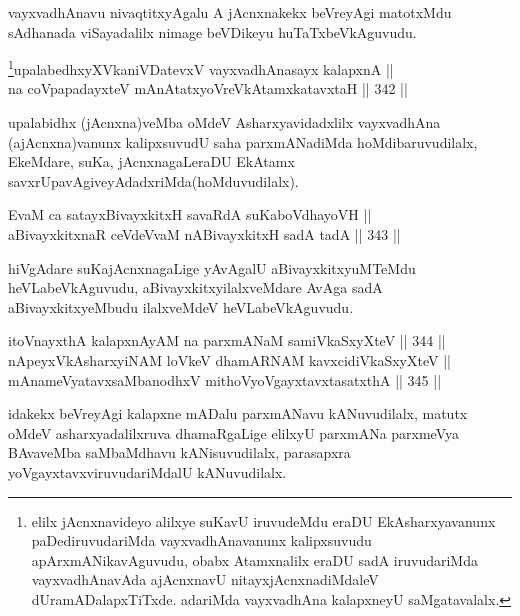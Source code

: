 \begin{artha}
vayxvadhAnavu nivaqtitxyAgalu A jAcnxnakekx beVreyAgi matotxMdu
sAdhanada viSayadalilx nimage beVDikeyu huTaTxbeVkAguvudu.
\end{artha}

\begin{shl}
\footnote{elilx jAcnxnavideyo alilxye suKavU iruvudeMdu eraDU EkAsharxyavanunx paDediruvudariMda vayxvadhAnavanunx kalipxsuvudu apArxmANikavAguvudu, obabx Atamxnalilx eraDU sadA iruvudariMda vayxvadhAnavAda ajAcnxnavU nitayxjAcnxnadiMdaleV dUramADalapxTiTxde. adariMda vayxvadhAna kalapxneyU saMgatavalalx.}upalabedhxyXVkaniVDatevxV vayxvadhAnasayx kalapxnA || \\
na coVpapadayxteV mAnAtatxyoVreVkAtamxkatavxtaH \hfill || 342 ||  
\end{shl}

\begin{artha}
upalabidhx (jAcnxna)veMba oMdeV Asharxyavidadxlilx
vayxvadhAna (ajAcnxna)\break vanunx kalipxsuvudU saha parxmANadiMda hoMdibaruvudilalx, EkeMdare, suKa, jAcnxnagaLeraDU EkAtamx
savxrUpavAgiveyAdadxriMda\break (hoMduvudilalx).
\end{artha}


\begin{shl}
EvaM ca satayxBivayxkitxH savaRdA suKaboVdhayoVH || \\
aBivayxkitxnaR ceVdeVvaM nABivayxkitxH sadA tadA \hfill || 343 ||  
\end{shl}

\begin{artha}
hiVgAdare suKajAcnxnagaLige yAvAgalU aBivayxkitxyuMTeMdu
heVLabeVkAguvudu, aBivayxkitxyilalxveMdare AvAga sadA
aBivayxkitxyeMbudu ilalxveMdeV heVLabeVkAguvudu.
\end{artha}

\begin{shl}
itoV\s nayxthA kalapxnAyAM na parxmANaM samiVkaSxyXteV \hfill || 344 ||  \\
nApeyxVkAsharxyiNAM loVkeV dhamARNAM kavxcidiVkaSxyXteV || \\
mAnameVyatavxsaMbanodhxV mithoVyoVgayxtavxtasatxthA \hfill || 345 ||  
\end{shl}

\begin{artha}
idakekx beVreyAgi kalapxne mADalu parxmANavu kANuvudilalx, matutx oMdeV asharxyadalilxruva dhamaRgaLige elilxyU parxmANa parxmeVya BAvaveMba saMbaMdhavu kANisuvudilalx, parasapxra yoVgayxtavxviruvudariMdalU kANuvudilalx.
\end{artha}

